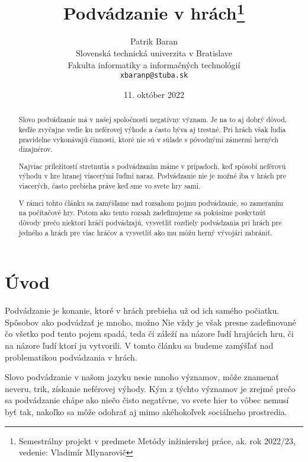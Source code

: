 \documentclass[10pt, oneside, slovak,a4paper]{article}
\title{Podvádzanie v hrách\thanks{Semestrálny projekt v predmete Metódy inžinierskej práce, ak. rok 2022/23, vedenie: Vladimír Mlynarovič}} %
\author{Patrik Baran\\[2pt]
	{\small Slovenská technická univerzita v Bratislave}\\
	{\small Fakulta informatiky a informačných technológií}\\
	{\small \texttt{xbaranp@stuba.sk}}
	}
\date{\small 11. október 2022} %
\begin{document}
\maketitle

\begin{abstract}
Slovo podvádzanie má v našej spoločnosti negatívny význam. Je na to aj dobrý dôvod, keďže zvyčajne vedie ku neférovej výhode a často býva aj trestné. Pri hrách však ľudia pravidelne vykonávajú činnosti, ktoré nie sú v súlade s pôvodnými zámermi herných dizajnérov.

Najviac príležitostí stretnutia s podvádzaním máme v prípadoch, keď spôsobí neférovú výhodu v hre hranej viacerými ľuďmi naraz. Podvádzanie nie je možné iba v hrách pre viacerých, často prebieha práve keď sme vo svete hry sami.

V rámci tohto článku sa zamýšľame nad rozsahom pojmu podvádzanie, so zameraním na počítačové hry. Potom ako tento rozsah zadefinujeme sa pokúsime poskytnúť dôvody prečo niektorí hráči podvádzajú, vysvetliť rozdiely podvádzania pri hrách pre jedného a hrách pre viac hráčov a vysvetliť ako mu môžu herný vývojári zabrániť.
\end{abstract}

\newpage


\section*{Úvod}
%


Podvádzanie je konanie, ktoré v hrách prebieha už od ich samého počiatku. Spôsobov ako podvádzať je mnoho, možno 
%
%
Nie vždy je však presne zadefinované čo všetko pod tento pojem spadá, teda či záleží na názore ľudí hrajúcich hru, či na názore ľudí ktorí ju vytvorili. V tomto článku sa budeme zamýšľať nad problematikou podvádzania v hrách.

Slovo podvádzanie v našom jazyku nesie mnoho významov, môže znamenať neveru, trik, získanie neférovej výhody. Kým z týchto významov je zrejmé prečo sa podvádzanie chápe ako niečo čisto negatívne, vo svete hier to vôbec nemusí byť tak, nakoľko sa môže odohrať aj mimo akéhokoľvek sociálneho prostredia.
\end{document}
